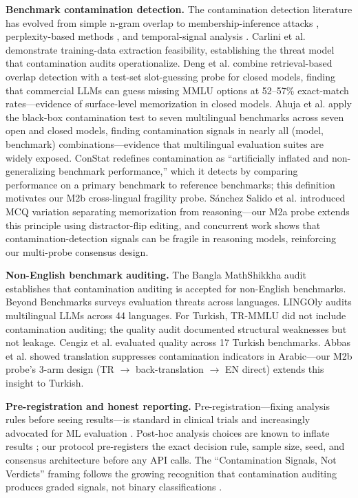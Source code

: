 \documentclass[letterpaper]{article}
\begin{document}
\textbf{Benchmark contamination detection.} The contamination detection literature has evolved from simple n-gram overlap \cite{brown2020gpt3} to membership-inference attacks \cite{geng2022detecting}, perplexity-based methods \cite{oren2023proving}, and temporal-signal analysis \cite{zhang2025test}. Carlini et al. \cite{carlini2021extracting} demonstrate training-data extraction feasibility, establishing the threat model that contamination audits operationalize. Deng et al. \cite{yang2024data} combine retrieval-based overlap detection with a test-set slot-guessing probe for closed models, finding that commercial LLMs can guess missing MMLU options at 52--57\% exact-match rates---evidence of surface-level memorization in closed models. Ahuja et al. \cite{contammulti2024} apply the black-box contamination test \cite{oren2023proving} to seven multilingual benchmarks across seven open and closed models, finding contamination signals in nearly all (model, benchmark) combinations---evidence that multilingual evaluation suites are widely exposed. ConStat \cite{constat2024} redefines contamination as ``artificially inflated and non-generalizing benchmark performance,'' which it detects by comparing performance on a primary benchmark to reference benchmarks; this definition motivates our M2b cross-lingual fragility probe. S\'{a}nchez Salido et al. \cite{sanchz2025mcq} introduced MCQ variation separating memorization from reasoning---our M2a probe extends this principle using distractor-flip editing, and concurrent work \cite{fragilereasoning2025} shows that contamination-detection signals can be fragile in reasoning models, reinforcing our multi-probe consensus design.

\textbf{Non-English benchmark auditing.} The Bangla MathShikkha audit \cite{mathshikkha2024} establishes that contamination auditing is accepted for non-English benchmarks. Beyond Benchmarks \cite{beyondbench2025} surveys evaluation threats across languages. LINGOly \cite{lingoly2024} audits multilingual LLMs across 44 languages. For Turkish, TR-MMLU \cite{trmmu2024} did not include contamination auditing; the quality audit \cite{yildiz2025evaluating} documented structural weaknesses but not leakage. Cengiz et al. \cite{yildiz2025evaluating} evaluated quality across 17 Turkish benchmarks. Abbas et al. \cite{abbas2026obscuring} showed translation suppresses contamination indicators in Arabic---our M2b probe's 3-arm design (TR $\rightarrow$ back-translation $\rightarrow$ EN direct) extends this insight to Turkish.

\textbf{Pre-registration and honest reporting.} Pre-registration---fixing analysis rules before seeing results---is standard in clinical trials and increasingly advocated for ML evaluation \cite{pineau2020reproducibility}. Post-hoc analysis choices are known to inflate results \cite{pineau2020reproducibility}; our protocol pre-registers the exact decision rule, sample size, seed, and consensus architecture before any API calls. The ``Contamination Signals, Not Verdicts'' framing follows the growing recognition that contamination auditing produces graded signals, not binary classifications \cite{gaokao2024}.
\end{document}
